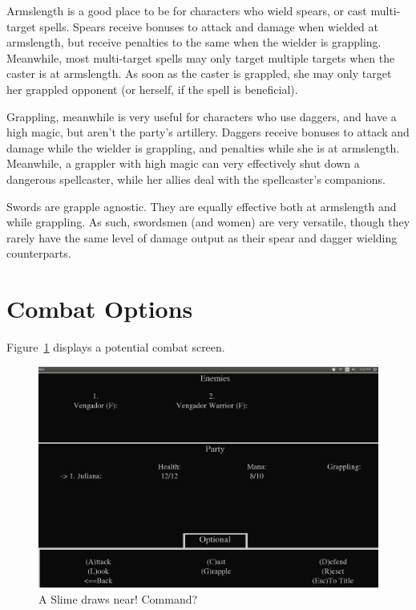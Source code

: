 \documentclass{report}
\begin{document}
Armslength is a good place to be for characters who wield spears, or cast 
multi-target spells. Spears receive bonuses to attack and damage when wielded at
armslength, but receive penalties to the same when the wielder is grappling. 
Meanwhile, most multi-target spells may only target multiple targets when the 
caster is at armslength. As soon as the caster is grappled, she may only target
her grappled opponent (or herself, if the spell is beneficial).

Grappling, meanwhile is very useful for characters who use daggers, and have a 
high magic, but aren't the party's artillery. Daggers receive bonuses to attack
and damage while the wielder is grappling, and penalties while she is at
armslength. Meanwhile, a grappler with high magic can very effectively shut down
a dangerous spellcaster, while her allies deal with the spellcaster's companions.

Swords are grapple agnostic. They are equally effective both at armslength and
while grappling. As such, swordsmen (and women) are very versatile, though they rarely have the 
same level of damage output as their spear and dagger wielding counterparts.

\section{Combat Options}

Figure~\ref{fig_combat} displays a potential combat screen.


\begin{figure}[h!]
    \includegraphics[width=\textwidth]{combat}
    \caption{A Slime draws near! Command?}
    \label{fig_combat}
\end{figure}
\end{document}
